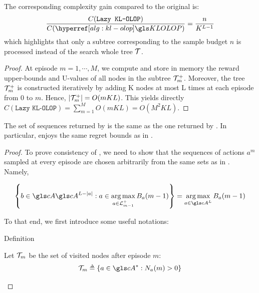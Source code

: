 \begin{subappendices}
\begin{proposition}
\begin{leftbar}[propositionbar]
		The corresponding complexity gain compared to the original  is: 
		\begin{equation*}
		\frac{C(\texttt{Lazy KL-OLOP})}{C(\KLOLOP)} = \frac{n}{K^{L-1}}
		\end{equation*}
		which highlights that only a subtree corresponding to the sample budget $n$ is processed instead of the search whole tree $\mathcal{T}$.
	\end{leftbar}
\end{proposition}
\begin{proof}
	At episode $m = 1, \cdots, M$, we compute and store in memory the reward upper-bounds and U-values of all nodes in the subtree $\mathcal{T}_m^+$. Moreover, the tree $\mathcal{T}_m^+$ is constructed iteratively by adding K nodes at most L times at each episode from 0 to $m$. Hence, $|\mathcal{T}_m^+| = O(mKL)$.
	This yields directly $C(\texttt{Lazy KL-OLOP}) = \sum_{m=1}^M O(mKL) = O(M^2KL)$.
\end{proof}

\begin{proposition}[Consistency]
	\label{prop:consistency}
	\begin{leftbar}[propositionbar]
		The set of sequences returned by  is the same as the one returned by .
		In particular,  enjoys the same regret bounds as in .
	\end{leftbar}
\end{proposition}

\begin{proof}
	To prove consistency of , we need to show that the sequences of actions $a^m$ sampled at every episode are chosen arbitrarily from the same sets as in .
	Namely, 
	
	\begin{equation*}
	\left\{ b\in \cA \cA^{L-|a|} : a \in \argmax_{a\in \LL_{m-1}^+} B_a(m-1)\right\} = \argmax_{a\in \cA^L} B_a(m-1)
	\end{equation*}
	
	To that end, we first introduce some useful notations:
	
	\begin{paragraph}{Definition}
		\begin{leftbar}[defnbar]
		Let $\mathcal{T}_m$ be the set of visited nodes after episode $m$:
		\begin{equation*}
		\Tau_m \eqdef \left\{a\in \cA^*: N_a(m) > 0\right\}
		\end{equation*}
		

\end{leftbar}
\end{paragraph}
\end{proof}
\end{subappendices}
